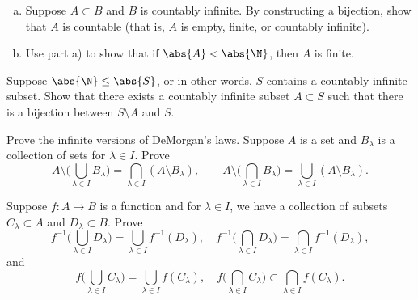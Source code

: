 \begin{exercise}
\leavevmode
\begin{enumerate}[a)]
\item
Suppose $A \subset B$ and $B$ is countably infinite.  By constructing a
bijection, show that $A$ is
countable (that is, $A$ is empty, finite, or countably infinite).
\item 
Use part a) to show that if $\abs{A} < \abs{\N}$, then $A$ is finite.
\end{enumerate}
\end{exercise}

\begin{exercise}[Challenging] \label{exercise:countsubsetbij}
Suppose $\abs{\N} \leq \abs{S}$, or in other words, $S$
contains a countably infinite subset.
Show that there exists a countably infinite subset $A \subset S$
such that there is 
a bijection between $S \setminus A$ and $S$.
\end{exercise}

\begin{exercise}
Prove the infinite versions of DeMorgan's laws.
Suppose $A$ is a set and $B_\lambda$ is a collection of sets for $\lambda
\in I$.  Prove
\begin{equation*}
A \setminus \biggl(
\bigcup_{\lambda \in I} B_\lambda
\biggr)
=
\bigcap_{\lambda \in I}
(
A \setminus
B_\lambda
) ,
\qquad
A \setminus \biggl(
\bigcap_{\lambda \in I} B_\lambda
\biggr)
=
\bigcup_{\lambda \in I}
(
A \setminus
B_\lambda
) .
\end{equation*}
\end{exercise}

\begin{exercise}
Suppose $f \colon A \to B$ is a function and for $\lambda \in I$, we have
a collection of subsets $C_\lambda \subset A$ and
$D_\lambda \subset B$.  Prove
\begin{equation*}
f^{-1} \biggl(
\bigcup_{\lambda \in I} D_\lambda
\biggr)
=
\bigcup_{\lambda \in I}
f^{-1}(D_\lambda) ,
\quad
f^{-1} \biggl(
\bigcap_{\lambda \in I} D_\lambda
\biggr)
=
\bigcap_{\lambda \in I}
f^{-1}(D_\lambda) ,
\end{equation*}
and
\begin{equation*}
f \biggl(
\bigcup_{\lambda \in I} C_\lambda
\biggr)
=
\bigcup_{\lambda \in I}
f(C_\lambda) ,
\quad
f \biggl(
\bigcap_{\lambda \in I} C_\lambda
\biggr)
\subset
\bigcap_{\lambda \in I}
f(C_\lambda) .
\end{equation*}
\end{exercise}
